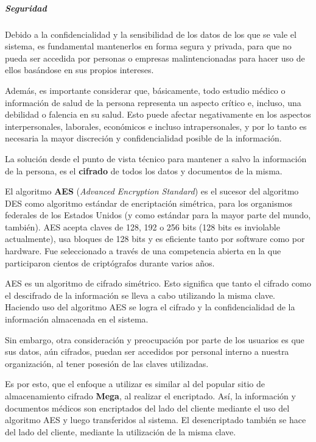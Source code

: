     


\subparagraph{Seguridad}
    
    Debido a la confidencialidad y la sensibilidad de los datos de los que se vale el sistema, es fundamental mantenerlos en forma segura y privada, para que no pueda ser accedida por personas o empresas malintencionadas para hacer uso de ellos basándose en sus propios intereses.
    
    Además, es importante considerar que, básicamente, todo estudio médico o información de salud de la persona representa un aspecto crítico e, incluso, una debilidad o falencia en su salud.
    Esto puede afectar negativamente en los aspectos interpersonales, laborales, económicos e incluso intrapersonales, y por lo tanto es necesaria la mayor discreción y confidencialidad posible de la información.
    
    La solución desde el punto de vista técnico para mantener a salvo la información de la persona, es el \textbf{cifrado} de todos los datos y documentos de la misma.
    
    El algoritmo \textbf{AES} (\textit{Advanced Encryption Standard}) es el sucesor del algoritmo DES como algoritmo estándar de encriptación simétrica, para los organismos federales de los Estados Unidos (y como estándar para la mayor parte del mundo, también).
    AES acepta claves de 128, 192 o 256 bits (128 bits es inviolable actualmente), usa bloques de 128 bits y es eficiente tanto por software como por hardware.
    Fue seleccionado a través de una competencia abierta en la que participaron cientos de criptógrafos durante varios años.
    
    AES es un algoritmo de cifrado simétrico.
    Esto significa que tanto el cifrado como el descifrado de la información se lleva a cabo utilizando la misma clave.
    Haciendo uso del algoritmo AES se logra el cifrado y la confidencialidad de la información almacenada en el sistema.
    
    Sin embargo, otra consideración y preocupación por parte de los usuarios es que sus datos, aún cifrados, puedan ser accedidos por personal interno a nuestra organización, al tener posesión de las claves utilizadas.
    
    Es por esto, que el enfoque a utilizar es similar al del popular sitio de almacenamiento cifrado \textbf{Mega}, al realizar el encriptado.
    Así, la información y documentos médicos son encriptados del lado del cliente mediante el uso del algoritmo AES y luego transferidos al sistema.
    El desencriptado también se hace del lado del cliente, mediante la utilización de la misma clave.
    
